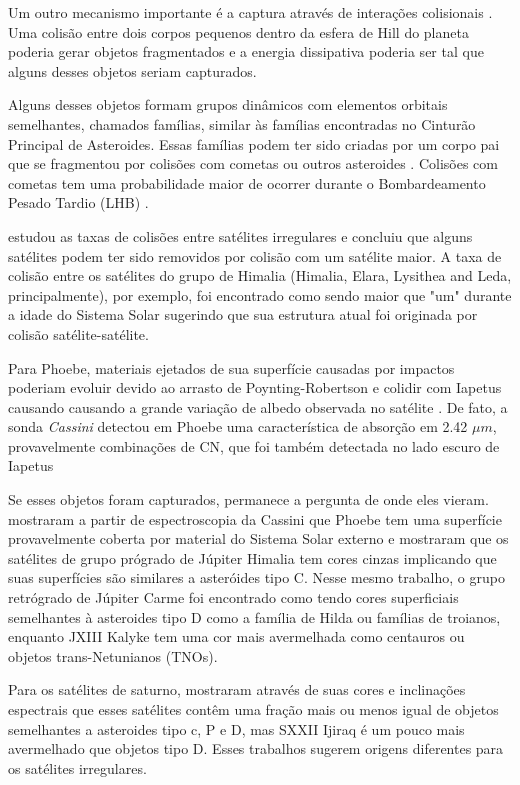 \documentclass[12pt,a4paper]{monografia}
\begin{document}
Um outro mecanismo importante é a captura através de interações colisionais \citep{Sheppard2005}. Uma colisão entre dois corpos pequenos dentro da esfera de Hill do planeta poderia gerar objetos fragmentados e a energia dissipativa poderia ser tal que alguns desses objetos seriam capturados.

Alguns desses objetos formam grupos dinâmicos com elementos orbitais semelhantes, chamados famílias, similar às famílias encontradas no Cinturão Principal de Asteroides. Essas famílias podem ter sido criadas por um corpo pai que se fragmentou por colisões com cometas ou outros asteroides \citep{Nesvorny2004}. Colisões com cometas tem uma probabilidade maior de ocorrer durante o Bombardeamento Pesado Tardio (LHB) \citep{Gomes2005}.

\cite{Nesvorny2003} estudou as taxas de colisões entre satélites irregulares e concluiu que alguns satélites podem ter sido removidos por colisão com um satélite maior. A taxa de colisão entre os satélites do grupo de Himalia (Himalia, Elara, Lysithea and Leda, principalmente), por exemplo, foi encontrado como sendo maior que "um" durante a idade do Sistema Solar sugerindo que sua estrutura atual foi originada por colisão satélite-satélite.

Para Phoebe, materiais ejetados de sua superfície causadas por impactos poderiam evoluir devido ao arrasto de Poynting-Robertson e colidir com Iapetus causando causando a grande variação de albedo observada no satélite \citep{Nesvorny2003}. De fato, a sonda \textit{Cassini} detectou em Phoebe uma característica de absorção em 2.42 $\mu m$, provavelmente combinações de CN, que foi também detectada no lado escuro de Iapetus \citep{Clark2005}

Se esses objetos foram capturados, permanece a pergunta de onde eles vieram. \citealp{Clark2005} mostraram a partir de espectroscopia da Cassini que Phoebe tem uma superfície provavelmente coberta por material do Sistema Solar externo e \citealp{Grav2003} mostraram que os satélites de grupo prógrado de Júpiter Himalia tem cores cinzas implicando que suas superfícies são similares a asteróides tipo C. Nesse mesmo trabalho, o grupo retrógrado de Júpiter Carme foi encontrado como tendo cores superficiais semelhantes à asteroides tipo D como a família de Hilda ou famílias de troianos, enquanto JXIII Kalyke tem uma cor mais avermelhada como centauros ou objetos trans-Netunianos (TNOs).

Para os satélites de saturno, \citealp{Grav2007} mostraram através de suas cores e inclinações espectrais que esses satélites contêm uma fração mais ou menos igual de objetos semelhantes a asteroides tipo c, P e D, mas SXXII Ijiraq é um pouco mais avermelhado que objetos tipo D. Esses trabalhos sugerem origens diferentes para os satélites irregulares.
\end{document}

